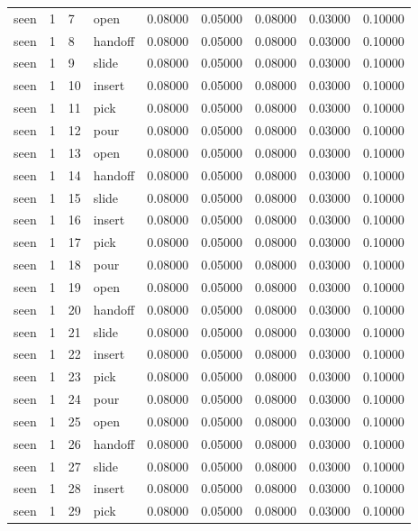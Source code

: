 \documentclass{article}
\begin{document}
\begin{center}
\begin{longtable}{lllllllll}
seen & 1 & 7 & open & 0.08000 & 0.05000 & 0.08000 & 0.03000 & 0.10000 \\
seen & 1 & 8 & handoff & 0.08000 & 0.05000 & 0.08000 & 0.03000 & 0.10000 \\
seen & 1 & 9 & slide & 0.08000 & 0.05000 & 0.08000 & 0.03000 & 0.10000 \\
seen & 1 & 10 & insert & 0.08000 & 0.05000 & 0.08000 & 0.03000 & 0.10000 \\
seen & 1 & 11 & pick & 0.08000 & 0.05000 & 0.08000 & 0.03000 & 0.10000 \\
seen & 1 & 12 & pour & 0.08000 & 0.05000 & 0.08000 & 0.03000 & 0.10000 \\
seen & 1 & 13 & open & 0.08000 & 0.05000 & 0.08000 & 0.03000 & 0.10000 \\
seen & 1 & 14 & handoff & 0.08000 & 0.05000 & 0.08000 & 0.03000 & 0.10000 \\
seen & 1 & 15 & slide & 0.08000 & 0.05000 & 0.08000 & 0.03000 & 0.10000 \\
seen & 1 & 16 & insert & 0.08000 & 0.05000 & 0.08000 & 0.03000 & 0.10000 \\
seen & 1 & 17 & pick & 0.08000 & 0.05000 & 0.08000 & 0.03000 & 0.10000 \\
seen & 1 & 18 & pour & 0.08000 & 0.05000 & 0.08000 & 0.03000 & 0.10000 \\
seen & 1 & 19 & open & 0.08000 & 0.05000 & 0.08000 & 0.03000 & 0.10000 \\
seen & 1 & 20 & handoff & 0.08000 & 0.05000 & 0.08000 & 0.03000 & 0.10000 \\
seen & 1 & 21 & slide & 0.08000 & 0.05000 & 0.08000 & 0.03000 & 0.10000 \\
seen & 1 & 22 & insert & 0.08000 & 0.05000 & 0.08000 & 0.03000 & 0.10000 \\
seen & 1 & 23 & pick & 0.08000 & 0.05000 & 0.08000 & 0.03000 & 0.10000 \\
seen & 1 & 24 & pour & 0.08000 & 0.05000 & 0.08000 & 0.03000 & 0.10000 \\
seen & 1 & 25 & open & 0.08000 & 0.05000 & 0.08000 & 0.03000 & 0.10000 \\
seen & 1 & 26 & handoff & 0.08000 & 0.05000 & 0.08000 & 0.03000 & 0.10000 \\
seen & 1 & 27 & slide & 0.08000 & 0.05000 & 0.08000 & 0.03000 & 0.10000 \\
seen & 1 & 28 & insert & 0.08000 & 0.05000 & 0.08000 & 0.03000 & 0.10000 \\
seen & 1 & 29 & pick & 0.08000 & 0.05000 & 0.08000 & 0.03000 & 0.10000 \\

\end{longtable}
\end{center}
\end{document}
